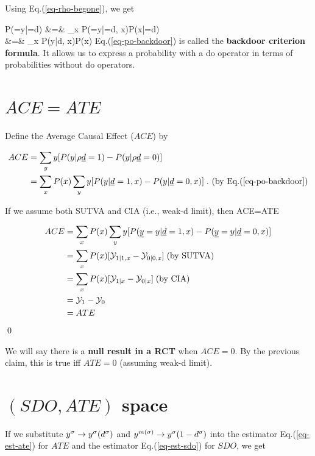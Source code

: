 Using Eq.(\ref{eq-rho-begone}), we get

\beqa
P(\rvy=y|\rho\rvd=d)
&=&
\sum_x 
P(\rvy=y|\rho\rvd=d, x)P(x|\rho\rvd=d)
\\
&=&
\sum_x 
P(y|d, x)P(x)
\label{eq-po-backdoor}
\eeqa
Eq.(\ref{eq-po-backdoor})
is called the {\bf backdoor criterion formula}.
It allows us to
express a
probability
with a do operator
in terms 
of  probabilities
without do operators.

\section{$ACE=ATE$}



Define the Average
Causal Effect ($ACE$) by

\begin{align}
ACE&=\sum_y y
[P(y|\rho{\underline{d}}=1)-P(y|\rho{\underline{d}}=0)]
\\
&=
\sum_x P(x)\sum_y y [P(y|{\underline{d}}=1,x)-P(y|{\underline{d}}=0,x)]
\;. \text{ (by Eq.(\ref{eq-po-backdoor})}
\label{eq-my-backdoor-proof} 
\end{align}


\begin{claim}\label{cl-ace-ate}
If we assume both SUTVA and 
CIA (i.e., weak-d limit), then
\beq
ACE=ATE
\eeq
\end{claim}
\proof



\begin{align}
ACE&=
\sum_x P(x)\sum_y y [P({\underline{y}}=y|{\underline{d}}=1,x)-
P({\underline{y}}=y|{\underline{d}}=0,x)] 
\\
&=\sum_x P(x)[{\cal Y}_{1|1, x}-{\cal Y}_{0|0, x}]
\;\text{(by SUTVA)}
\\
&=\sum_x P(x)[{\cal Y}_{1|x}-{\cal Y}_{0|x}]
\;\text{(by CIA)}
\\
&=
{\cal Y}_{1}-{\cal Y}_{0}
\\
&=
ATE
\end{align}
\qed

We will say there is a {\bf null result
in a RCT} when $ACE=0$. By the previous claim, 
this is true iff $ATE=0$
(assuming weak-d limit).

\section{$(SDO,ATE)$ space}
If we substitute
$y^\sigma\rightarrow y^\sigma( d^\sigma)$ and
 $y^{m(\sigma)}\rightarrow y^\sigma(1-d^\sigma)$ 
into 
the estimator
Eq.(\ref{eq-est-ate}) for $ATE$
and the estimator
Eq.(\ref{eq-est-sdo}) for $SDO$,
we get

